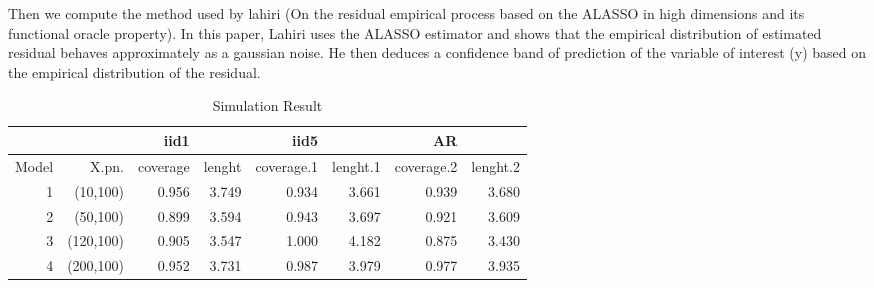 \documentclass[11pt,oneside, a4paper]{amsart}\usepackage[]{graphicx}\usepackage[]{color}
\begin{document}
\begin{table}[ht]
\centering
\caption{Simulation Result} 
\label{Test_table}
{\footnotesize
{}
}
\end{table}




Then we compute the method used by lahiri (On the residual empirical process based on the ALASSO in high dimensions and its functional oracle property). In this paper, Lahiri uses the ALASSO estimator and shows that the empirical distribution of estimated residual behaves approximately as a gaussian noise. He then deduces a confidence band of prediction of the variable of interest (y) based on the empirical distribution of the residual.





\begin{table}[ht]
\centering
\caption{Simulation Result} 
\label{Test_table}
{\footnotesize
\begin{tabular}{|r|r|rr|rr|rr|}
  \toprule 
    &  & iid1 &  & iid5 & & AR & \\
 \midrule 
Model & X.pn. & coverage & lenght & coverage.1 & lenght.1 & coverage.2 & lenght.2 \\ 
    1 & (10,100) & 0.956 & 3.749 & 0.934 & 3.661 & 0.939 & 3.680 \\ 
     2 & (50,100) & 0.899 & 3.594 & 0.943 & 3.697 & 0.921 & 3.609 \\ 
     3 & (120,100) & 0.905 & 3.547 & 1.000 & 4.182 & 0.875 & 3.430 \\ 
     4 & (200,100) & 0.952 & 3.731 & 0.987 & 3.979 & 0.977 & 3.935 \\ 
   \bottomrule 
\end{tabular}
}
\end{table}
\end{document}
